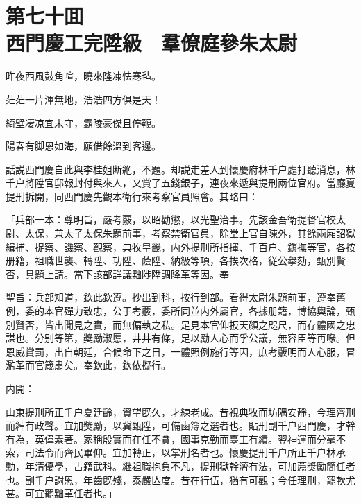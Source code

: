 
\chapter*{第七十囬　\\西門慶工完陞級　羣僚庭參朱太尉}


\begin{myquote}
昨夜西風鼓角喧，曉來隆凍怯寒毡。

茫茫一片渾無地，浩浩四方俱是天！

綺壁凄凉宜未守，霸陵豪傑且停鞭。

陽春有脚恩如海，願借餘溫到客邊。
\end{myquote}

話説西門慶自此與李桂姐断絶，不題。却説走差人到懷慶府林千户處打聽消息，林千户將陞官邸報封付與來人，又賞了五錢銀子，連夜來遞與提刑兩位官府。當廳夏提刑拆開，同西門慶先觀本衛行來考察官員照會。其略曰：

\begin{myquote}[\markfont]
「兵部一本：尊明旨，嚴考覈，以昭勸懲，以光聖治事。先該金吾衛提督官校太尉、太保，兼太子太保朱題前事，考察禁衛官員，除堂上官自陳外，其餘兩廂詔獄緝捕、捉察、譏察、觀察，典牧皇畿，内外提刑所指揮、千百户、鎭撫等官，各按册籍，祖職世襲、轉陞、功陞、蔭陞、納級等項，各挨次格，従公擧劾，甄別賢否，具題上請。當下該部詳議黜陟陞調降革等因。奉

聖旨：兵部知道，欽此欽遵。抄出到科，按行到部。看得太尉朱題前事，遵奉舊例，委的本官殫力致忠，公于考覈，委所同並内外屬官，各據册籍，博協輿論，甄別賢否，皆出聞見之實，而無偏執之私。足見本官仰扳天顔之咫尺，而存體國之忠謀也。分别等第，獎勵淑慝，井井有條，足以勵人心而孚公議，無容臣等再喙。但恩威賞罰，出自朝廷，合候命下之日，一體照例施行等因，庶考覈明而人心服，冒濫革而官箴肅矣。奉欽此，欽依擬行。

内開：

山東提刑所正千户夏廷齡，資望旣久，才練老成。昔視典牧而坊隅安靜，今理齊刑而綽有政聲。宜加獎勵，以冀甄陞，可備鹵簿之選者也。貼刑副千户西門慶，才幹有為，英偉素著。家稱殷實而在任不貪，國事克勤而臺工有績。翌神運而分毫不索，司法令而齊民畢仰。宜加轉正，以掌刑名者也。懷慶提刑千户所正千户林承勳，年清優學，占籍武科。継祖職抱負不凡，提刑獄幹濟有法，可加薦獎勵簡任者也。副千户謝恩，年齒旣殘，泰嚴亾度。昔在行伍，猶有可觀；今任理刑，罷軟尤甚。可宜罷黜革任者也。」
\end{myquote}

